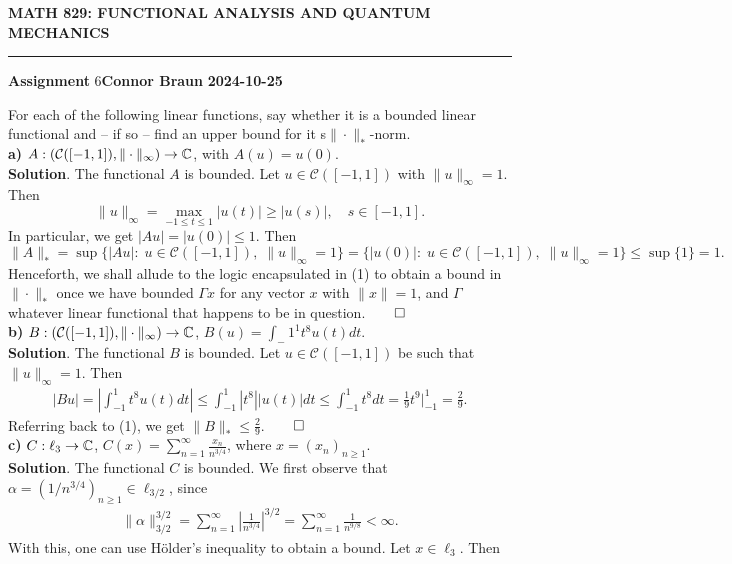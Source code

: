 \documentclass[10pt]{article}
\newcommand{\1}[1]{\mathbbm{1}_{#1}} \newcommand{\mc}[1]{\mathcal{#1}}
\begin{document}
    \begin{center}
        {\bf\large{MATH 829: FUNCTIONAL ANALYSIS AND QUANTUM MECHANICS}}
        \smallskip
        \hrule
        \smallskip
        {\bf Assignment} 6\hfill {\bf Connor Braun} \hfill {\bf 2024-10-25}
    \end{center}
    \vspace{5pt}
     For each of the following linear functions, say whether it is a bounded linear functional and -- if so -- find an upper bound for it s$\|\cdot\|_\ast$-norm.\\[5pt]
    {\bf a)} $A:(\mc{C}([-1,1]), \|\cdot\|_\infty)\rightarrow\mbb{C}$, with $A(u)=u(0)$.\\[5pt]
    {\bf Solution}. The functional $A$ is bounded. Let $u\in \mc{C}([-1,1])$ with $\|u\|_\infty=1$. Then
    \[\|u\|_\infty=\max_{-1\leq t\leq 1}|u(t)|\geq |u(s)|,\quad s\in[-1,1].\]
    In particular, we get $|Au|=|u(0)|\leq 1$. Then
    \[\|A\|_\ast=\sup\{|Au|:\;u\in \mc{C}([-1,1]),\;\|u\|_\infty=1\}=\{|u(0)|:\;u\in \mc{C}([-1,1]),\;\|u\|_\infty=1\}\leq\sup\{1\}=1.\tag{1}\]
    Henceforth, we shall allude to the logic encapsulated in (1) to obtain a bound in $\|\cdot\|_\ast$ once we have bounded $\Gamma x$ for any vector $x$ with $\|x\|=1$, and $\Gamma$
    whatever linear functional that happens to be in question.\hfill{$\qed$}\\[5pt]
    {\bf b)} $B:(\mc{C}([-1,1]),\|\cdot\|_\infty)\rightarrow\mbb{C}$, $B(u)=\int_-1^1t^8u(t)dt$.\\[5pt]
    {\bf Solution}. The functional $B$ is bounded. Let $u\in \mc{C}([-1,1])$ be such that $\|u\|_\infty=1$. Then
    \begin{align*}
        |Bu|=\left|\int_{-1}^1t^8u(t)dt\right|\leq \int_{-1}^1|t^8||u(t)|dt\leq \int_{-1}^1t^8dt=\frac{1}{9}t^9\bigg|^{1}_{-1}=\frac{2}{9}.
    \end{align*}
    Referring back to (1), we get $\|B\|_\ast\leq\frac{2}{9}$.\hfill{$\qed$}\\[5pt]
    {\bf c)} $C:\ell_3\rightarrow\mathbb{C}$, $C(x)=\sum_{n=1}^\infty\frac{x_n}{n^{3/4}}$, where $x=(x_{n})_{n\geq 1}$.\\[5pt]
    {\bf Solution}. The functional $C$ is bounded. We first observe that $\alpha=(1/n^{3/4})_{n\geq 1}\in\ell_{3/2}$, since
    \begin{align*}
        \|\alpha\|_{3/2}^{3/2}=\sum_{n=1}^\infty\left|\frac{1}{n^{3/4}}\right|^{3/2}=\sum_{n=1}^\infty\frac{1}{n^{9/8}}<\infty.
    \end{align*}
    With this, one can use H\"older's inequality to obtain a bound. Let $x\in\ell_3$. Then
\end{document}
